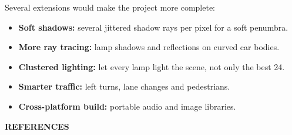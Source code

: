 \documentclass[12pt, a4paper]{report}
\begin{document}
\begin{justify}
  {\fontsize{12}{13.8}\selectfont
    Several extensions would make the project more complete:
    \begin{itemize}\setlength{\itemsep}{0pt}\setlength{\parskip}{0pt}
      \item \textbf{Soft shadows:} several jittered shadow rays per pixel for a soft penumbra.
      \item \textbf{More ray tracing:} lamp shadows and reflections on curved car bodies.
      \item \textbf{Clustered lighting:} let every lamp light the scene, not only the best 24.
      \item \textbf{Smarter traffic:} left turns, lane changes and pedestrians.
      \item \textbf{Cross-platform build:} portable audio and image libraries.
    \end{itemize}
  }
\end{justify}

\clearpage
{}

\begin{center}
  {\fontsize{14}{21}\bfseries REFERENCES}
\end{center}
\end{document}

